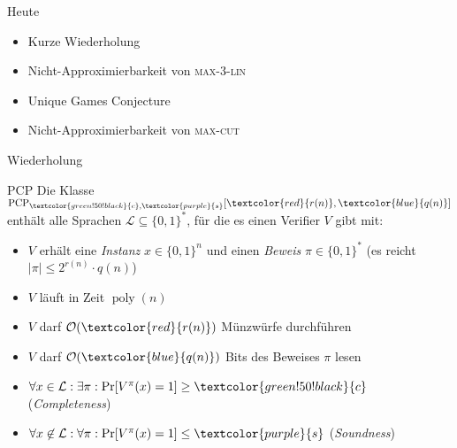 \documentclass[table,german,10pt]{beamer}
\author{Sebastian Berndt}
\DeclareMathOperator{\pcp}{PCP}
\DeclareMathOperator{\poly}{poly}
\newcommand{\red}[1]{\textcolor{red}{#1}}
\newcommand{\blue}[1]{\textcolor{blue}{#1}}
\newcommand{\green}[1]{\textcolor{green!50!black}{#1}}
\newcommand{\purple}[1]{\textcolor{purple}{#1}}
\begin{document}
\maketitle

\begin{frame}{Heute}
  \begin{itemize}[<+->]
  \item Kurze Wiederholung
  \item Nicht-Approximierbarkeit von \textsc{max-3-lin}
  \item Unique Games Conjecture
  \item Nicht-Approximierbarkeit von \textsc{max-cut}
  \end{itemize}
\end{frame}
\begin{frame}{Wiederholung}
  \begin{block}{PCP}
    Die Klasse $\pcp_{\green{c},\purple{s}}[\red{r(n)},\blue{q(n)}]$ enthält alle Sprachen
    $\mathcal{L}\subseteq \{0,1\}^{*}$, für die es einen
    Verifier $V$ gibt mit:
    \begin{itemize}[<+->]
    \item $V$ erhält eine \emph{Instanz} $x\in \{0,1\}^{n}$ und einen
      \emph{Beweis} $\pi\in \{0,1\}^{*}$ (es reicht $|\pi|\leq
      2^{r(n)}\cdot q(n)$)
    \item $V$ läuft in Zeit $\poly(n)$
    \item $V$ darf $\mathcal{O}(\red{r(n)})$ Münzwürfe durchführen
    \item $V$ darf $\mathcal{O}(\blue{q(n)})$ Bits des Beweises $\pi$ lesen
    \item $\forall x\in \mathcal{L}: \exists \pi: \Pr[V^{\pi}(x)=1]\geq \green{c}$ (\emph{Completeness})
    \item $\forall x\not\in \mathcal{L}:\forall \pi:
      \Pr[V^{\pi}(x)=1]\leq \purple{s}$ (\emph{Soundness})

    \end{itemize}
  \end{block}
\end{frame}
\end{document}
